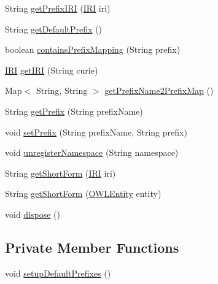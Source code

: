 \begin{DoxyCompactItemize}
\item 
String \hyperlink{classorg_1_1semanticweb_1_1owlapi_1_1util_1_1_default_prefix_manager_a091caf341bb25dd47379d0377b32cd1e}{get\-Prefix\-I\-R\-I} (\hyperlink{classorg_1_1semanticweb_1_1owlapi_1_1model_1_1_i_r_i}{I\-R\-I} iri)
\item 
String \hyperlink{classorg_1_1semanticweb_1_1owlapi_1_1util_1_1_default_prefix_manager_a01427e1dd1cba443dbb889cc7c898663}{get\-Default\-Prefix} ()
\item 
boolean \hyperlink{classorg_1_1semanticweb_1_1owlapi_1_1util_1_1_default_prefix_manager_aea00cf78e2ec5ced8b68158f6bae2ab1}{contains\-Prefix\-Mapping} (String prefix)
\item 
\hyperlink{classorg_1_1semanticweb_1_1owlapi_1_1model_1_1_i_r_i}{I\-R\-I} \hyperlink{classorg_1_1semanticweb_1_1owlapi_1_1util_1_1_default_prefix_manager_abd7e138805b339d8f21bd8ffe55856aa}{get\-I\-R\-I} (String curie)
\item 
Map$<$ String, String $>$ \hyperlink{classorg_1_1semanticweb_1_1owlapi_1_1util_1_1_default_prefix_manager_a0ec064ebaa60d9cc251ff5a202e82f05}{get\-Prefix\-Name2\-Prefix\-Map} ()
\item 
String \hyperlink{classorg_1_1semanticweb_1_1owlapi_1_1util_1_1_default_prefix_manager_a5ee8be3ecb39fce9ffe6351a904f36a9}{get\-Prefix} (String prefix\-Name)
\item 
void \hyperlink{classorg_1_1semanticweb_1_1owlapi_1_1util_1_1_default_prefix_manager_a0ce8431ec151af36994223e9bd3718db}{set\-Prefix} (String prefix\-Name, String prefix)
\item 
void \hyperlink{classorg_1_1semanticweb_1_1owlapi_1_1util_1_1_default_prefix_manager_ae0a756a86d4e2b6294d79fc9cde24adb}{unregister\-Namespace} (String namespace)
\item 
String \hyperlink{classorg_1_1semanticweb_1_1owlapi_1_1util_1_1_default_prefix_manager_abed8a48c7389624a6b78865123fadd35}{get\-Short\-Form} (\hyperlink{classorg_1_1semanticweb_1_1owlapi_1_1model_1_1_i_r_i}{I\-R\-I} iri)
\item 
String \hyperlink{classorg_1_1semanticweb_1_1owlapi_1_1util_1_1_default_prefix_manager_aa44cf377291498d03507e32c0b8a942f}{get\-Short\-Form} (\hyperlink{interfaceorg_1_1semanticweb_1_1owlapi_1_1model_1_1_o_w_l_entity}{O\-W\-L\-Entity} entity)
\item 
void \hyperlink{classorg_1_1semanticweb_1_1owlapi_1_1util_1_1_default_prefix_manager_a9e0f74009d8d52f84c2e0ac0452bc494}{dispose} ()
\end{DoxyCompactItemize}
\subsection*{Private Member Functions}
\begin{DoxyCompactItemize}
\item 
void \hyperlink{classorg_1_1semanticweb_1_1owlapi_1_1util_1_1_default_prefix_manager_a43ccd3b75ea864d7032cd1151dc1d5bb}{setup\-Default\-Prefixes} ()
\end{DoxyCompactItemize}
